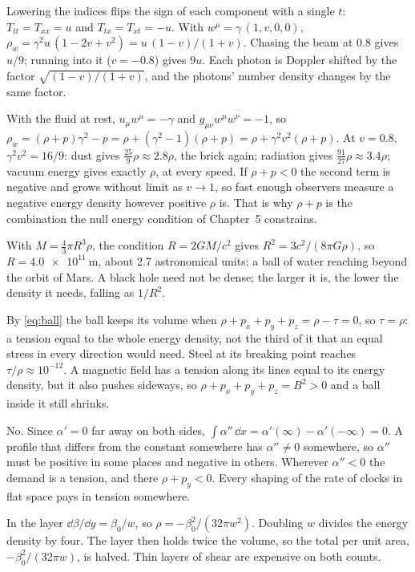 \begin{checkanswers}
\item[\ref{chk:laser}] Lowering the indices flips the sign of each component
  with a single $t$: $T_{tt} = T_{xx} = u$ and $T_{tx} = T_{xt} = -u$. With
  $w^{\mu} = \gamma\,(1, v, 0, 0)$,
  $\rho_{w} = \gamma^{2}u\,(1 - 2v + v^{2}) = u\,(1 - v)/(1 + v)$. Chasing the
  beam at $0.8$ gives $u/9$; running into it ($v = -0.8$) gives $9u$. Each
  photon is Doppler shifted by the factor $\sqrt{(1 - v)/(1 + v)}$, and the
  photons' number density changes by the same factor.
\item[\ref{chk:rho-p}] With the fluid at rest, $u_{\mu}w^{\mu} = -\gamma$ and
  $g_{\mu\nu}w^{\mu}w^{\nu} = -1$, so
  $\rho_{w} = (\rho + p)\gamma^{2} - p = \rho + (\gamma^{2} - 1)(\rho + p)
  = \rho + \gamma^{2}v^{2}(\rho + p)$. At $v = 0.8$, $\gamma^{2}v^{2} = 16/9$:
  dust gives $\tfrac{25}{9}\rho \approx 2.8\rho$, the brick again; radiation
  gives $\tfrac{91}{27}\rho \approx 3.4\rho$; vacuum energy gives exactly
  $\rho$, at every speed. If $\rho + p < 0$ the second term is negative and
  grows without limit as $v \to 1$, so fast enough observers measure a
  negative energy density however positive $\rho$ is. That is why $\rho + p$
  is the combination the null energy condition of Chapter~5 constrains.
\item[\ref{chk:water}] With $M = \tfrac43\pi R^{3}\rho$, the condition
  $R = 2GM/c^{2}$ gives $R^{2} = 3c^{2}/(8\pi G\rho)$, so
  $R = \SI{4.0e11}{\metre}$, about 2.7 astronomical units: a ball of water
  reaching beyond the orbit of Mars. A black hole need not be dense; the
  larger it is, the lower the density it needs, falling as $1/R^{2}$.
\item[\ref{chk:stop-tension}] By \cref{eq:ball} the ball keeps its volume when
  $\rho + p_{x} + p_{y} + p_{z} = \rho - \tau = 0$, so $\tau = \rho$: a tension
  equal to the whole energy density, not the third of it that an equal stress
  in every direction would need. Steel at its breaking point reaches
  $\tau/\rho \approx 10^{-12}$. A magnetic field has a tension along its lines
  equal to its energy density, but it also pushes sideways, so
  $\rho + p_{x} + p_{y} + p_{z} = B^{2} > 0$ and a ball inside it still
  shrinks.
\item[\ref{chk:lapse-dip}] No. Since $\alpha' = 0$ far away on both sides,
  $\int \alpha''\,\dd x = \alpha'(\infty) - \alpha'(-\infty) = 0$. A profile
  that differs from the constant somewhere has $\alpha'' \ne 0$ somewhere, so
  $\alpha''$ must be positive in some places and negative in others. Wherever
  $\alpha'' < 0$ the demand is a tension, and there $\rho + p_{y} < 0$. Every
  shaping of the rate of clocks in flat space pays in tension somewhere.
\item[\ref{chk:shear-width}] In the layer $\dd\beta/\dd y = \beta_{0}/w$, so
  $\rho = -\beta_{0}^{2}/(32\pi w^{2})$. Doubling $w$ divides the energy
  density by four. The layer then holds twice the volume, so the total per
  unit area, $-\beta_{0}^{2}/(32\pi w)$, is halved. Thin layers of shear are
  expensive on both counts.
\end{checkanswers}

